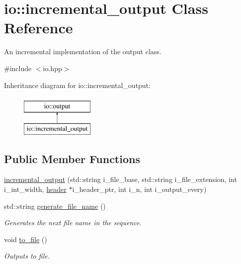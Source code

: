 \hypertarget{classio_1_1incremental__output}{\section{io\-:\-:incremental\-\_\-output Class Reference}
\label{classio_1_1incremental__output}
}


An incremental implementation of the output class.  




{\ttfamily \#include $<$io.\-hpp$>$}

Inheritance diagram for io\-:\-:incremental\-\_\-output\-:\begin{figure}[H]
\begin{center}
\leavevmode
\includegraphics[height=2.000000cm]{classio_1_1incremental__output}
\end{center}
\end{figure}
\subsection*{Public Member Functions}
\begin{DoxyCompactItemize}
\item 
\hyperlink{classio_1_1incremental__output_a01308d0fb0a638bd9f382deecfbe82a5}{incremental\-\_\-output} (std\-::string i\-\_\-file\-\_\-base, std\-::string i\-\_\-file\-\_\-extension, int i\-\_\-int\-\_\-width, \hyperlink{classio_1_1header}{header} $\ast$i\-\_\-header\-\_\-ptr, int i\-\_\-n, int i\-\_\-output\-\_\-every)
\item 
std\-::string \hyperlink{classio_1_1incremental__output_a239bbe0e73c9c26b7eab7970dac95a56}{generate\-\_\-file\-\_\-name} ()
\begin{DoxyCompactList}\small\item\em Generates the next file name in the sequence. \end{DoxyCompactList}\item 
void \hyperlink{classio_1_1incremental__output_a966b0a04f3150e1060d69fd08aed0c99}{to\-\_\-file} ()
\begin{DoxyCompactList}\small\item\em Outputs to file. \end{DoxyCompactList}\end{DoxyCompactItemize}
